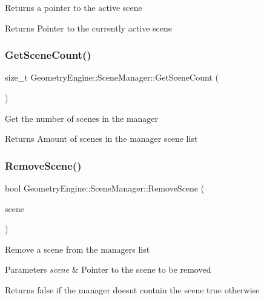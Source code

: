 Returns a pointer to the active scene \begin{DoxyReturn}{Returns}
Pointer to the currently active scene 
\end{DoxyReturn}
\mbox{\label{class_geometry_engine_1_1_scene_manager_ae968659ac54b71f6089e2251c99cfd04}} 
\subsubsection{\texorpdfstring{GetSceneCount()}{GetSceneCount()}}
{\footnotesize\ttfamily size\+\_\+t Geometry\+Engine\+::\+Scene\+Manager\+::\+Get\+Scene\+Count (\begin{DoxyParamCaption}{ }\end{DoxyParamCaption})\hspace{0.3cm}{\ttfamily [inline]}}

Get the number of scenes in the manager \begin{DoxyReturn}{Returns}
Amount of scenes in the manager scene list 
\end{DoxyReturn}
\mbox{\label{class_geometry_engine_1_1_scene_manager_a31890e580c47aceaeab795e8886bcf82}} 
\subsubsection{\texorpdfstring{RemoveScene()}{RemoveScene()}\hspace{0.1cm}{\footnotesize\ttfamily [1/2]}}
{\footnotesize\ttfamily bool Geometry\+Engine\+::\+Scene\+Manager\+::\+Remove\+Scene (\begin{DoxyParamCaption}\item[{\mbox{\hyperlink{class_geometry_engine_1_1_geometry_scene_1_1_geometry_scene}{Geometry\+Scene\+::\+Geometry\+Scene}} $\ast$}]{scene }\end{DoxyParamCaption})}

Remove a scene from the manager\textquotesingle{}s list 
\begin{DoxyParams}{Parameters}
{\em scene} & Pointer to the scene to be removed \\
\hline
\end{DoxyParams}
\begin{DoxyReturn}{Returns}
false if the manager doesn\textquotesingle{}t contain the scene true otherwise 
\end{DoxyReturn}
\mbox{\label{class_geometry_engine_1_1_scene_manager_ad8ca79bfce997398df387dd42d6e4312}} 

